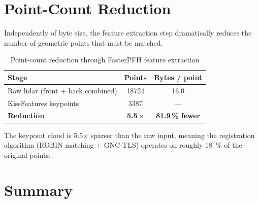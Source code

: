 \documentclass[a4paper,11pt]{article}
\begin{document}
\section{Point-Count Reduction}

Independently of byte size, the feature extraction step dramatically reduces
the number of geometric points that must be matched.

\begin{table}[h]
\centering
\caption{Point-count reduction through FasterPFH feature extraction}
\label{tab:points}
\begin{tabular}{lSS}
\toprule
\textbf{Stage} & {\textbf{Points}} & {\textbf{Bytes / point}} \\
\midrule
{}
Raw lidar (front + back combined) & 18724 & 16.0 \\
KissFeatures keypoints            &  3387 & {---} \\
\midrule
{}
\textbf{Reduction} &
  \textbf{5.5\,$\times$} &
  {\textbf{81.9\,\% fewer}} \\
\bottomrule
\end{tabular}
\end{table}

The keypoint cloud is 5.5$\times$ sparser than the raw input, meaning the
registration algorithm (ROBIN matching + GNC-TLS) operates on roughly
\SI{18}{\percent} of the original points.

\section{Summary}
\end{document}
